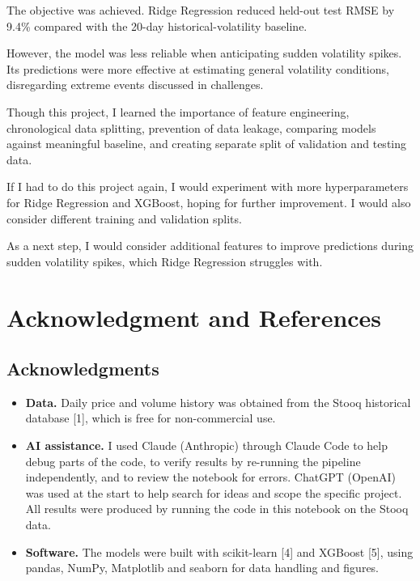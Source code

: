 \documentclass[11pt]{article}
\begin{document}
The objective was achieved. Ridge Regression reduced held-out test RMSE by 9.4\% compared with the 20-day historical-volatility baseline.

However, the model was less reliable when anticipating sudden volatility spikes. Its predictions were more effective at estimating general volatility conditions, disregarding extreme events discussed in challenges.

Though this project, I learned the importance of feature engineering, chronological data splitting, prevention of data leakage, comparing models against meaningful baseline, and creating separate split of validation and testing data.

If I had to do this project again, I would experiment with more hyperparameters for Ridge Regression and XGBoost, hoping for further improvement. I would also consider different training and validation splits.

As a next step, I would consider additional features to improve predictions during sudden volatility spikes, which Ridge Regression struggles with.

\section{Acknowledgment and References}

\subsection*{Acknowledgments}

\begin{itemize}
\item \textbf{Data.} Daily price and volume history was obtained from the Stooq historical database [1], which is free for non-commercial use.
\item \textbf{AI assistance.} I used Claude (Anthropic) through Claude Code to help debug parts of the code, to verify results by re-running the pipeline independently, and to review the notebook for errors. ChatGPT (OpenAI) was used at the start to help search for ideas and scope the specific project. All results were produced by running the code in this notebook on the Stooq data.
\item \textbf{Software.} The models were built with scikit-learn [4] and XGBoost [5], using pandas, NumPy, Matplotlib and seaborn for data handling and figures.
\end{itemize}
\end{document}
